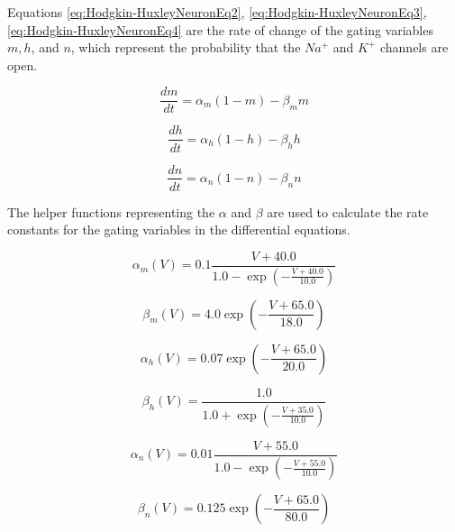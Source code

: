 			\begin{multicols}{2}
			
				\par Equations \ref{eq:Hodgkin-HuxleyNeuronEq2}, \ref{eq:Hodgkin-HuxleyNeuronEq3}, \ref{eq:Hodgkin-HuxleyNeuronEq4} are the rate of change of the gating variables $m, h$, and $n$, which represent the probability that the $Na^+$ and $K^+$ channels are open.
				
	
			\columnbreak
	
				\begin{equation}
					\label{eq:Hodgkin-HuxleyNeuronEq2}
					\frac{dm}{dt} = \alpha_m (1 - m) - \beta_m m
				\end{equation}
			
				\begin{equation}
					\label{eq:Hodgkin-HuxleyNeuronEq3}
					\frac{dh}{dt} = \alpha_h (1 - h) - \beta_h h
				\end{equation}
			
				\begin{equation}
					\label{eq:Hodgkin-HuxleyNeuronEq4}
					\frac{dn}{dt} = \alpha_n (1 - n) - \beta_n n
				\end{equation}
			
			\end{multicols}
			
			\begin{multicols}{2}
				\par The helper functions representing the $\alpha$ and $\beta$ are used to calculate the rate constants for the gating variables in the differential equations.	
				
			\columnbreak
				\begin{equation}
					\alpha_m(V) = 0.1 \frac{V + 40.0}{1.0 - \exp\left(-\frac{V + 40.0}{10.0}\right)}
				\end{equation}
			
				\begin{equation}
					\beta_m(V) = 4.0 \exp\left(-\frac{V + 65.0}{18.0}\right)
				\end{equation}
			
				\begin{equation}
					\alpha_h(V) = 0.07 \exp\left(-\frac{V + 65.0}{20.0}\right)
				\end{equation}
			
				\begin{equation}
					\beta_h(V) = \frac{1.0}{1.0 + \exp\left(-\frac{V + 35.0}{10.0}\right)}
				\end{equation}
			
				\begin{equation}
					\alpha_n(V) = 0.01 \frac{V + 55.0}{1.0 - \exp\left(-\frac{V + 55.0}{10.0}\right)}
				\end{equation}
		
				\begin{equation}
					\beta_n(V) = 0.125 \exp\left(-\frac{V + 65.0}{80.0}\right)
				\end{equation}
			\end{multicols}
			
